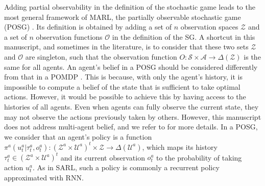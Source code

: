 Adding partial observability in the definition of the stochastic game leads to the most general framework of MARL, the partially observable stochastic game (POSG) \citep{hansen2004dynamic}.
Its definition is obtained by adding a set of $n$ observation spaces $\mathcal{Z}$ and a set of $n$ observation functions $\mathcal{O}$ in the definition of the SG.
A shortcut in this manuscript, and sometimes in the literature, is to consider that these two sets $\mathcal{Z}$ and $\mathcal{O}$ are singleton, such that the observation function $O:\mathcal{S} \times \mathcal{A} \rightarrow \Delta(\mathcal{Z})$ is the same for all agents.
An agent's belief in a POSG should be considered differently from that in a POMDP \citep{DecPomdp}.
This is because, with only the agent's history, it is impossible to compute a belief of the state that is sufficient to take optimal actions.
However, it would be possible to achieve this by having access to the histories of all agents.
Even when agents can fully observe the current state, they may not observe the actions previously taken by others.
However, this manuscript does not address multi-agent belief, and we refer to \citep{DecPomdp} for more details.
In a POSG, we consider that an agent's policy is a function $\pi^{a}(u_t^{a}|\tau_t^{a},o_t^{a}): (\mathcal{Z}^a \times \mathcal{U}^a)^t \times \mathcal{Z} \rightarrow \Delta(\mathcal{U}^a)$, which maps its history $\tau_t^{a} \in (\mathcal{Z}^a \times \mathcal{U}^a)^{t}$ and its current observation $o_t^{a}$ to the probability of taking action $u_t^{a}$.
As in SARL, such a policy is commonly a recurrent policy approximated with RNN.
